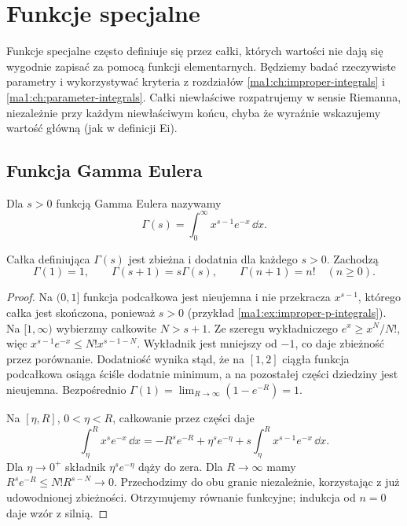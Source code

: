 \chapter{Funkcje specjalne}
\label{ma1:ch:special-functions}

Funkcje specjalne często definiuje się przez całki, których wartości nie dają się wygodnie zapisać za pomocą funkcji elementarnych. Będziemy badać rzeczywiste parametry i wykorzystywać kryteria z rozdziałów \ref{ma1:ch:improper-integrals} i \ref{ma1:ch:parameter-integrals}. Całki niewłaściwe rozpatrujemy w sensie Riemanna, niezależnie przy każdym niewłaściwym końcu, chyba że wyraźnie wskazujemy wartość główną (jak w definicji Ei).

\section{Funkcja Gamma Eulera}
\begin{definicja}
\label{ma1:def:gamma}
Dla $s>0$ funkcją Gamma Eulera nazywamy
\[
 \Gamma(s)=\int_0^\infty x^{s-1}e^{-x}\,\dd x.
\]
\end{definicja}
\begin{twierdzenie}
\label{ma1:thm:gamma-properties}
Całka definiująca $\Gamma(s)$ jest zbieżna i dodatnia dla każdego $s>0$. Zachodzą
\[
 \Gamma(1)=1,\qquad \Gamma(s+1)=s\Gamma(s),\qquad
 \Gamma(n+1)=n!\quad(n\ge0).
\]
\end{twierdzenie}
\begin{proof}
Na $(0,1]$ funkcja podcałkowa jest nieujemna i nie przekracza $x^{s-1}$, którego całka jest skończona, ponieważ $s>0$ (przykład \ref{ma1:ex:improper-p-integrals}). Na $[1,\infty)$ wybierzmy całkowite $N>s+1$. Ze szeregu wykładniczego $e^x\ge x^N/N!$, więc $x^{s-1}e^{-x}\le N!x^{s-1-N}$. Wykładnik jest mniejszy od $-1$, co daje zbieżność przez porównanie. Dodatniość wynika stąd, że na $[1,2]$ ciągła funkcja podcałkowa osiąga ściśle dodatnie minimum, a na pozostałej części dziedziny jest nieujemna. Bezpośrednio $\Gamma(1)=\lim_{R\to\infty}(1-e^{-R})=1$.

Na $[\eta,R]$, $0<\eta<R$, całkowanie przez części daje
\[
 \int_\eta^R x^s e^{-x}\,\dd x
 =-R^s e^{-R}+\eta^s e^{-\eta}
 +s\int_\eta^R x^{s-1}e^{-x}\,\dd x.
\]
Dla $\eta\to0^+$ składnik $\eta^s e^{-\eta}$ dąży do zera. Dla $R\to\infty$ mamy $R^s e^{-R}\le N!R^{s-N}\to0$. Przechodzimy do obu granic niezależnie, korzystając z już udowodnionej zbieżności. Otrzymujemy równanie funkcyjne; indukcja od $n=0$ daje wzór z silnią.
\end{proof}
